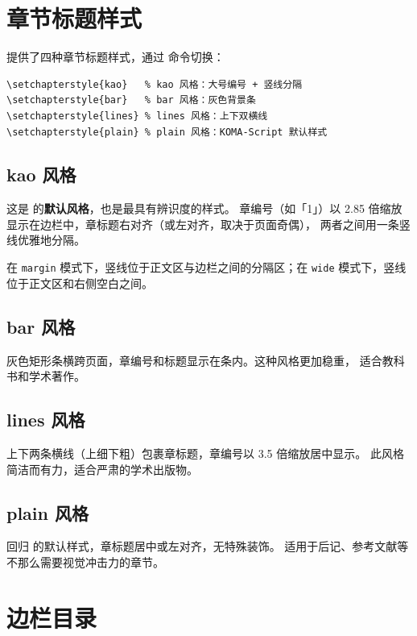 \section{章节标题样式}

 提供了四种章节标题样式，通过 
命令切换：

\begin{lstlisting}[caption=切换章节标题样式]
\setchapterstyle{kao}   % kao 风格：大号编号 + 竖线分隔
\setchapterstyle{bar}   % bar 风格：灰色背景条
\setchapterstyle{lines} % lines 风格：上下双横线
\setchapterstyle{plain} % plain 风格：KOMA-Script 默认样式
\end{lstlisting}

\subsection{kao 风格}

这是  的\textbf{默认风格}，也是最具有辨识度的样式。
章编号（如「1」）以 2.85 倍缩放显示在边栏中，章标题右对齐（或左对齐，取决于页面奇偶），
两者之间用一条竖线优雅地分隔。

在 \texttt{margin} 模式下，竖线位于正文区与边栏之间的分隔区；在 \texttt{wide}
模式下，竖线位于正文区和右侧空白之间。

\subsection{bar 风格}

灰色矩形条横跨页面，章编号和标题显示在条内。这种风格更加稳重，
适合教科书和学术著作。

\subsection{lines 风格}

上下两条横线（上细下粗）包裹章标题，章编号以 3.5 倍缩放居中显示。
此风格简洁而有力，适合严肃的学术出版物。

\subsection{plain 风格}

回归 \KOMAScript 的默认样式，章标题居中或左对齐，无特殊装饰。
适用于后记、参考文献等不那么需要视觉冲击力的章节。

\section{边栏目录}


